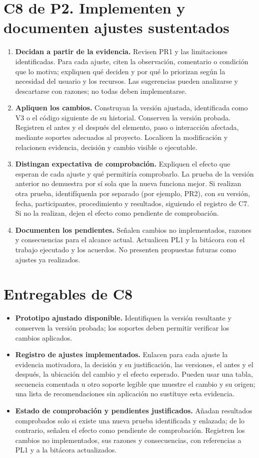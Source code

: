 \newpage
\section*{C8 de P2. Implementen y documenten ajustes sustentados}
\begin{enumerate}[resume=pasos]
\item \textbf{Decidan a partir de la evidencia.} Revisen PR1 y las limitaciones identificadas. Para cada ajuste, citen la observación, comentario o condición que lo motiva; expliquen qué deciden y por qué lo priorizan según la necesidad del usuario y los recursos. Las sugerencias pueden analizarse y descartarse con razones; no todas deben implementarse.
\item \textbf{Apliquen los cambios.} Construyan la versión ajustada, identificada como V3 o el código siguiente de su historial. Conserven la versión probada. Registren el antes y el después del elemento, paso o interacción afectada, mediante soportes adecuados al proyecto. Localicen la modificación y relacionen evidencia, decisión y cambio visible o ejecutable.
\item \textbf{Distingan expectativa de comprobación.} Expliquen el efecto que esperan de cada ajuste y qué permitiría comprobarlo. La prueba de la versión anterior no demuestra por sí sola que la nueva funciona mejor. Si realizan otra prueba, identifíquenla por separado (por ejemplo, PR2), con su versión, fecha, participantes, procedimiento y resultados, siguiendo el registro de C7. Si no la realizan, dejen el efecto como pendiente de comprobación.
\item \textbf{Documenten los pendientes.} Señalen cambios no implementados, razones y consecuencias para el alcance actual. Actualicen PL1 y la bitácora con el trabajo ejecutado y los acuerdos. No presenten propuestas futuras como ajustes ya realizados.
\end{enumerate}

\section*{Entregables de C8}
\begin{itemize}
\item \textbf{Prototipo ajustado disponible.} Identifiquen la versión resultante y conserven la versión probada; los soportes deben permitir verificar los cambios aplicados.
\item \textbf{Registro de ajustes implementados.} Enlacen para cada ajuste la evidencia motivadora, la decisión y su justificación, las versiones, el antes y el después, la ubicación del cambio y el efecto esperado. Pueden usar una tabla, secuencia comentada u otro soporte legible que muestre el cambio y su origen; una lista de recomendaciones sin aplicación no sustituye esta evidencia.
\item \textbf{Estado de comprobación y pendientes justificados.} Añadan resultados comprobados solo si existe una nueva prueba identificada y enlazada; de lo contrario, señalen el efecto como pendiente de comprobación. Registren los cambios no implementados, sus razones y consecuencias, con referencias a PL1 y a la bitácora actualizados.
\end{itemize}

